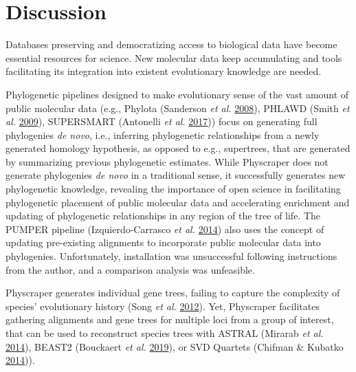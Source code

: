 \documentclass[]{article}
\begin{document}
\hypertarget{discussion}{%
\section{Discussion}\label{discussion}}

Databases preserving and democratizing access to biological data
have become essential resources for science.
New molecular data keep accumulating and tools facilitating its integration into existent evolutionary knowledge are needed.

Phylogenetic pipelines designed to make evolutionary sense of the vast amount of public molecular data (e.g., Phylota (Sanderson \emph{et al.} \protect\hyperlink{ref-sanderson2008phylota}{2008}), PHLAWD (Smith \emph{et al.} \protect\hyperlink{ref-smith2009mega}{2009}), SUPERSMART (Antonelli \emph{et al.} \protect\hyperlink{ref-antonelli2017toward}{2017})) focus on generating full phylogenies \emph{de novo}, i.e., inferring phylogenetic relationships from a newly generated homology hypothesis, as opposed to e.g., supertrees, that are generated by summarizing previous phylogenetic estimates.
While Physcraper does not generate phylogenies \emph{de novo} in a traditional sense,
it successfully generates new phylogenetic knowledge, revealing the importance of
open science in facilitating phylogenetic placement of public molecular data and accelerating enrichment and updating of phylogenetic relationships in any region of the tree of life.
The PUMPER pipeline (Izquierdo-Carrasco \emph{et al.} \protect\hyperlink{ref-izquierdo2014pumper}{2014}) also uses the concept of updating
pre-existing alignments to incorporate public molecular data into phylogenies. Unfortunately, installation was unsuccessful following instructions from the author, and a comparison analysis was unfeasible.

Physcraper generates individual gene trees, failing to capture the complexity of species' evolutionary history (Song \emph{et al.} \protect\hyperlink{ref-song2012resolving}{2012}). Yet, Physcraper facilitates gathering alignments and gene trees for multiple loci from a group of interest, that can be used to reconstruct species trees with ASTRAL (Mirarab \emph{et al.} \protect\hyperlink{ref-mirarab2014astral}{2014}), BEAST2 (Bouckaert \emph{et al.} \protect\hyperlink{ref-bouckaert2019beast}{2019}), or SVD Quartets (Chifman \& Kubatko \protect\hyperlink{ref-chifman2014quartet}{2014})).
\end{document}
